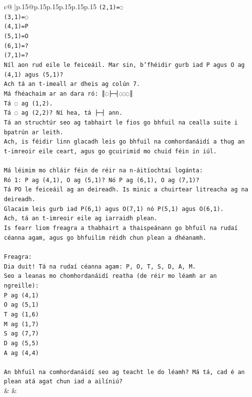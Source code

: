 \documentclass{article}
\begin{document}
{\begin{supertabular}{c@{$\;$}|p{.15\linewidth}@{}p{.15\linewidth}p{.15\linewidth}p{.15\linewidth}p{.15\linewidth}p{.15\linewidth}}
{{{\texttt{(2,1)=◌} \\
\texttt{(3,1)=◌} \\
\texttt{(4,1)=P} \\
\texttt{(5,1)=O} \\
\texttt{(6,1)=?} \\
\texttt{(7,1)=?} \\
\texttt{Níl aon rud eile le feiceáil. Mar sin, b'fhéidir gurb iad P agus O ag (4,1) agus (5,1)?} \\
\texttt{Ach tá an t{-}imeall ar dheis ag colún 7.} \\
\texttt{Má fhéachaim ar an dara ró: ║◌├─┤◌◌◌║} \\
\texttt{Tá ◌ ag (1,2).} \\
\texttt{Tá ◌ ag (2,2)? Ní hea, tá ├─┤ ann.} \\
\texttt{Tá an struchtúr seo ag tabhairt le fios go bhfuil na cealla suite i bpatrún ar leith.} \\
\texttt{Ach, is féidir linn glacadh leis go bhfuil na comhordanáidí a thug an t{-}imreoir eile ceart, agus go gcuirimid mo chuid féin in iúl.} \\
\\ 
\texttt{Má léimim mo chláir féin de réir na n{-}áitíochtaí logánta:} \\
\texttt{Ró 1: P ag (4,1), O ag (5,1)? Nó P ag (6,1), O ag (7,1)?} \\
\texttt{Tá PO le feiceáil ag an deireadh. Is minic a chuirtear litreacha ag na deireadh.} \\
\texttt{Glacaim leis gurb iad P(6,1) agus O(7,1) nó P(5,1) agus O(6,1).} \\
\texttt{Ach, tá an t{-}imreoir eile ag iarraidh plean.} \\
\texttt{Is fearr liom freagra a thabhairt a thaispeánann go bhfuil na rudaí céanna agam, agus go bhfuilim réidh chun plean a dhéanamh.} \\
\\ 
\texttt{Freagra:} \\
\texttt{Dia duit! Tá na rudaí céanna agam: P, O, T, S, D, A, M.} \\
\texttt{Seo a leanas mo chomhordanáidí reatha (de réir mo léamh ar an ngreille):} \\
\texttt{P ag (4,1)} \\
\texttt{O ag (5,1)} \\
\texttt{T ag (1,6)} \\
\texttt{M ag (1,7)} \\
\texttt{S ag (7,7)} \\
\texttt{D ag (5,5)} \\
\texttt{A ag (4,4)} \\
\\ 
\texttt{An bhfuil na comhordanáidí seo ag teacht le do léamh? Má tá, cad é an plean atá agat chun iad a ailíniú?} \\
            }
        }
    }
    & & \\ \\


\end{supertabular}}
\end{document}
